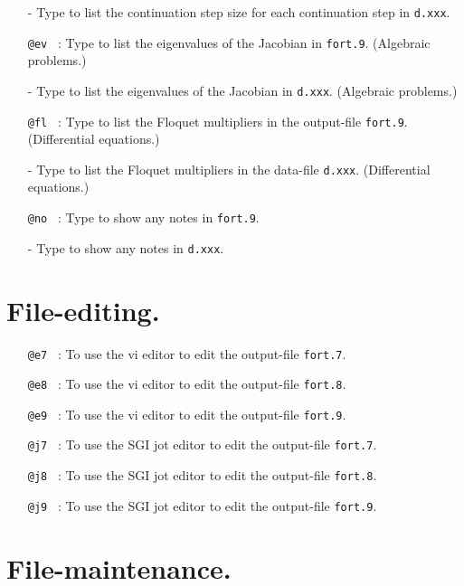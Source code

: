 \documentclass[12pt]{report}
\begin{document}
\begin{itemize}
  \item[-]
   Type  to list the continuation step size for each
  continuation step in {\tt d.xxx}. 
\item[\tt @ev]~:
  Type  to list the eigenvalues of the Jacobian 
  in {\tt fort.9}. 
  (Algebraic problems.)
  \item[-]
   Type  to list the eigenvalues of the Jacobian 
  in {\tt d.xxx}. 
  (Algebraic problems.)
\item[\tt @fl]~:
  Type  to list the Floquet multipliers
  in the output-file {\tt fort.9}. 
  (Differential equations.)
  \item[-]
   Type  to list the Floquet multipliers 
  in the data-file {\tt d.xxx}. 
  (Differential equations.)
\item[\tt @no]~:
  Type  to show any notes in {\tt fort.9}.
  \item[-]
  Type  to show any notes in {\tt d.xxx}.
\end{itemize}

\section{ File-editing.} 

\begin{itemize}

\item[\tt @e7]~:
  To use the vi editor to edit the output-file {\tt fort.7}.
\item[\tt @e8]~:
  To use the vi editor to edit the output-file {\tt fort.8}.
\item[\tt @e9]~:
  To use the vi editor to edit the output-file {\tt fort.9}.
\item[\tt @j7]~:
  To use the SGI jot editor to edit the output-file {\tt fort.7}.
\item[\tt @j8]~:
  To use the SGI jot editor to edit the output-file {\tt fort.8}.
\item[\tt @j9]~:
  To use the SGI jot editor to edit the output-file {\tt fort.9}.
  
\end{itemize}

\section{ File-maintenance.} 
\end{document}
